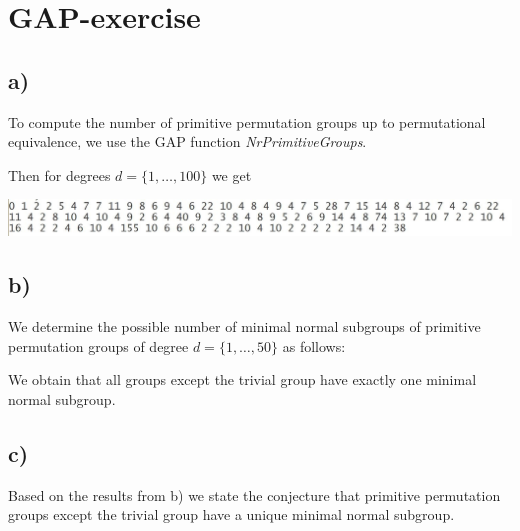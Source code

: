 \section{GAP-exercise}
\subsection*{a)}
To compute the number of primitive permutation groups up to permutational equivalence, we use the GAP function \textit{NrPrimitiveGroups}. 



Then for degrees $d = \{1,\dots, 100\}$ we get

\hspace*{-1cm}
\includegraphics[width=17cm]{ex5}

\subsection*{b)}
We determine the possible number of minimal normal subgroups of primitive permutation groups of degree $d = \{1,\dots, 50\}$ as follows:



We obtain that all groups except the trivial group have exactly one minimal normal subgroup.

\subsection*{c)}
Based on the results from b) we state the conjecture that primitive permutation groups except the trivial group have a unique minimal normal subgroup.